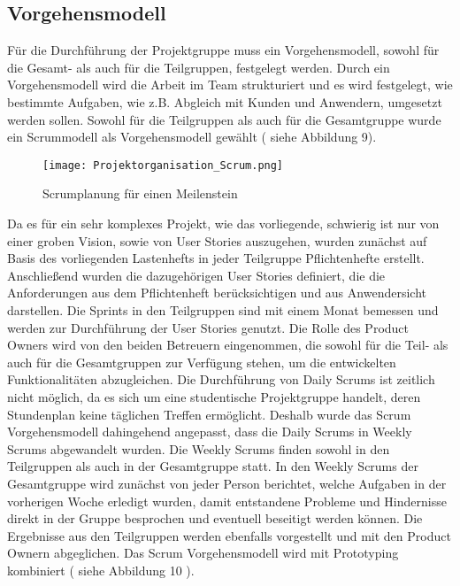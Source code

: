 \subsection{Vorgehensmodell}
Für die Durchführung der Projektgruppe muss ein Vorgehensmodell, sowohl für die Gesamt- als auch für die Teilgruppen, festgelegt werden. Durch ein Vorgehensmodell wird die Arbeit im Team strukturiert und es wird festgelegt, wie bestimmte Aufgaben, wie z.B. Abgleich mit Kunden und Anwendern, umgesetzt werden sollen. Sowohl für die Teilgruppen als auch für die Gesamtgruppe wurde ein Scrummodell als Vorgehensmodell gewählt ( siehe Abbildung 9).

	\begin{figure}[h!]
		\centering
			\texttt{[image: Projektorganisation\_Scrum.png]}
			\caption{Scrumplanung f\"ur einen Meilenstein}
			\label{Projektorganisation Scrum}
	\end{figure}	

Da es für ein sehr komplexes Projekt, wie das vorliegende, schwierig ist nur von einer groben Vision, sowie von User Stories auszugehen, wurden zun\"achst auf Basis des vorliegenden Lastenhefts in jeder Teilgruppe Pflichtenhefte erstellt. Anschließend wurden die dazugeh\"origen User Stories definiert, die die Anforderungen aus dem Pflichtenheft ber\"ucksichtigen und aus Anwendersicht darstellen. Die Sprints in den Teilgruppen sind mit einem Monat bemessen und werden zur Durchf\"uhrung der User Stories genutzt. Die Rolle des Product Owners wird von den beiden Betreuern eingenommen, die sowohl für die Teil- als auch für die Gesamtgruppen zur Verfügung stehen, um die entwickelten Funktionalit\"aten abzugleichen.
Die Durchf\"uhrung von Daily Scrums ist zeitlich nicht m\"oglich, da es sich um eine studentische Projektgruppe handelt, deren Stundenplan keine t\"aglichen Treffen erm\"oglicht. Deshalb wurde das Scrum Vorgehensmodell dahingehend angepasst, dass die Daily Scrums in Weekly Scrums abgewandelt wurden. Die Weekly Scrums finden sowohl in den Teilgruppen als auch in der Gesamtgruppe statt. In den Weekly Scrums der Gesamtgruppe wird zun\"achst von jeder Person berichtet, welche Aufgaben in der vorherigen Woche erledigt wurden, damit entstandene Probleme und Hindernisse direkt in der Gruppe besprochen und eventuell beseitigt werden k\"onnen. Die Ergebnisse aus den Teilgruppen werden ebenfalls vorgestellt und mit den Product Ownern abgeglichen.
Das Scrum Vorgehensmodell wird mit  Prototyping kombiniert ( siehe Abbildung 10 ).

